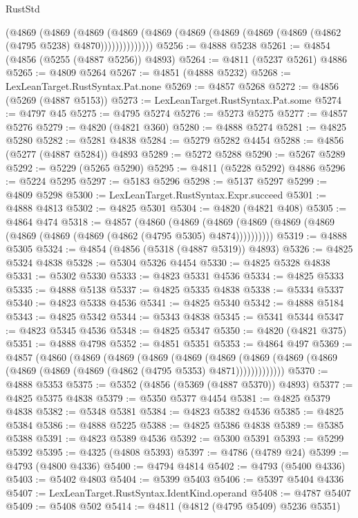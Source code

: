 \begin{lexlean}{RustStd}
\begin{coremodule}
            (@4869
              (@4869
                (@4869
                  (@4869 (@4869 (@4869 (@4869 (@4869 (@4869 (@4862 (@4795 @5238) @4870))))))))))))))
@5256 := @4888 @5238
@5261 := @4854 (@4856 (@5255 (@4887 @5256)) @4893)
@5264 := @4811 (@5237 @5261) @4886
@5265 := @4809 @5264
@5267 := @4851 (@4888 @5232)
@5268 := LexLeanTarget.RustSyntax.Pat.none
@5269 := @4857 @5268
@5272 := @4856 (@5269 (@4887 @5153))
@5273 := LexLeanTarget.RustSyntax.Pat.some
@5274 := @4797 @45
@5275 := @4795 @5274
@5276 := @5273 @5275
@5277 := @4857 @5276
@5279 := @4820 (@4821 @360)
@5280 := @4888 @5274
@5281 := @4825 @5280
@5282 := @5281 @4838
@5284 := @5279 @5282 @4454
@5288 := @4856 (@5277 (@4887 @5284)) @4893
@5289 := @5272 @5288
@5290 := @5267 @5289
@5292 := @5229 (@5265 @5290)
@5295 := @4811 (@5228 @5292) @4886
@5296 := @5224 @5295
@5297 := @5183 @5296
@5298 := @5137 @5297
@5299 := @4809 @5298
@5300 := LexLeanTarget.RustSyntax.Expr.succeed
@5301 := @4888 @4813
@5302 := @4825 @5301
@5304 := @4820 (@4821 @408)
@5305 := @4864 @474
@5318 := @4857
    (@4860
      (@4869 (@4869 (@4869 (@4869 (@4869 (@4869 (@4869 (@4869 (@4862 (@4795 @5305) @4874))))))))))
@5319 := @4888 @5305
@5324 := @4854 (@4856 (@5318 (@4887 @5319)) @4893)
@5326 := @4825 @5324 @4838
@5328 := @5304 @5326 @4454
@5330 := @4825 @5328 @4838
@5331 := @5302 @5330
@5333 := @4823 @5331 @4536
@5334 := @4825 @5333
@5335 := @4888 @5138
@5337 := @4825 @5335 @4838
@5338 := @5334 @5337
@5340 := @4823 @5338 @4536
@5341 := @4825 @5340
@5342 := @4888 @5184
@5343 := @4825 @5342
@5344 := @5343 @4838
@5345 := @5341 @5344
@5347 := @4823 @5345 @4536
@5348 := @4825 @5347
@5350 := @4820 (@4821 @375)
@5351 := @4888 @4798
@5352 := @4851 @5351
@5353 := @4864 @497
@5369 := @4857
    (@4860
      (@4869
        (@4869
          (@4869
            (@4869
              (@4869
                (@4869 (@4869 (@4869 (@4869 (@4869 (@4869 (@4862 (@4795 @5353) @4871)))))))))))))
@5370 := @4888 @5353
@5375 := @5352 (@4856 (@5369 (@4887 @5370)) @4893)
@5377 := @4825 @5375 @4838
@5379 := @5350 @5377 @4454
@5381 := @4825 @5379 @4838
@5382 := @5348 @5381
@5384 := @4823 @5382 @4536
@5385 := @4825 @5384
@5386 := @4888 @5225
@5388 := @4825 @5386 @4838
@5389 := @5385 @5388
@5391 := @4823 @5389 @4536
@5392 := @5300 @5391
@5393 := @5299 @5392
@5395 := @4325 (@4808 @5393)
@5397 := @4786 (@4789 @24)
@5399 := @4793 (@4800 @4336)
@5400 := @4794 @4814
@5402 := @4793 (@5400 @4336)
@5403 := @5402 @4803
@5404 := @5399 @5403
@5406 := @5397 @5404 @4336
@5407 := LexLeanTarget.RustSyntax.IdentKind.operand
@5408 := @4787 @5407
@5409 := @5408 @502
@5414 := @4811 (@4812 (@4795 @5409) @5236 @5351)

\end{coremodule}
\end{lexlean}
